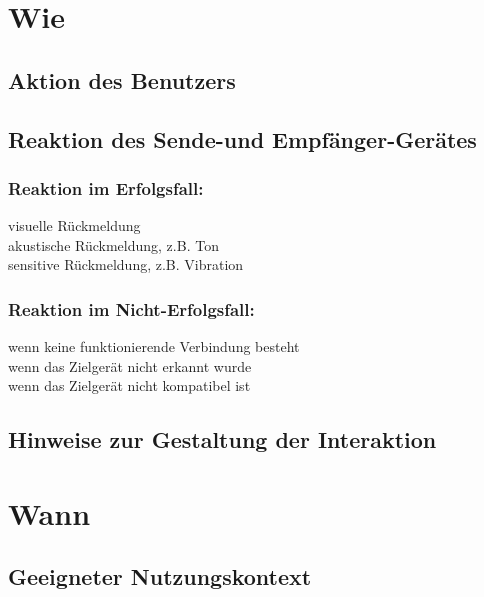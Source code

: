 
\section*{Wie}

\subsection*{Aktion des Benutzers}
\useraction

\subsection*{Reaktion des Sende-und Empfänger-Gerätes}
\reaction

\subsubsection*{Reaktion im Erfolgsfall:}
\checkbox{\reactionSuccessVisual} visuelle Rückmeldung \\
\checkbox{\reactionSuccessAcustic} akustische Rückmeldung, z.B. Ton \\
\checkbox{\reactionSuccessSensitive} sensitive Rückmeldung, z.B. Vibration \\

\subsubsection*{Reaktion im Nicht-Erfolgsfall:}
\checkbox{\reactionFailureConnection} wenn keine funktionierende Verbindung besteht \\
\checkbox{\reactionFailureNoDevice} wenn das Zielgerät nicht erkannt wurde \\
\checkbox{\reactionFailureCompatibility} wenn das Zielgerät nicht kompatibel ist

\subsection*{Hinweise zur Gestaltung der Interaktion}
\designnotes


\section*{Wann}

\subsection*{Geeigneter Nutzungskontext}

